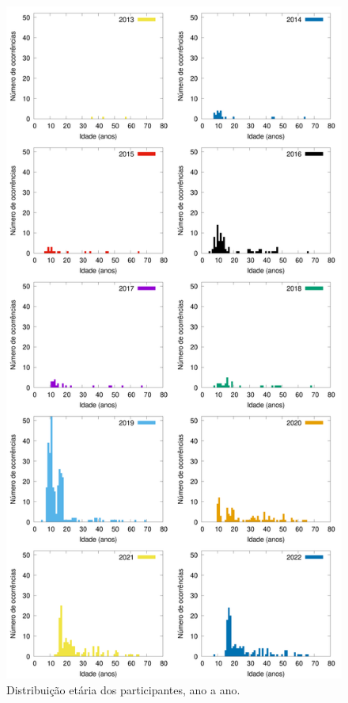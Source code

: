 \documentclass[
12pt,		%
openright,	%
twoside,  %
a4paper,			%
chapter=TITLE,		%
english,			%
french,				%
spanish,			%
brazil				%
]{USPSC-classe/USPSC_RedarTex}
\begin{document}
\captionsetup{format=plain}
\begin{figure}[Htb]

	\begin{center}

		\includegraphics[max size={\textwidth}]{../../imagens/histograma-de-idades-no-ano-do-evento.png}

	\end{center}

	\caption{\label{978341992d3d49498d48c41acc77f05f08f49ead}Distribui\c{c}\~ao et\'aria dos participantes, ano a ano.}

\end{figure}
\end{document}
